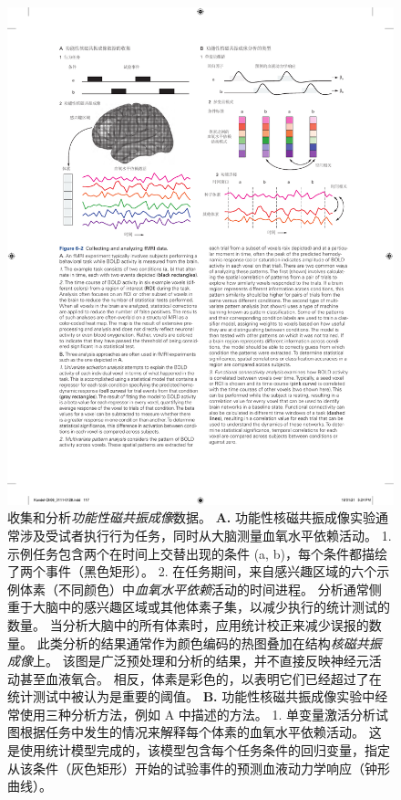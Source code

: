 \begin{figure}[htbp]
	\centering
	\includegraphics[width=1.0\linewidth]{chap06/fig_6_2}
	\caption{收集和分析\textit{功能性磁共振成像}数据。 
		\textbf{A.} 功能性核磁共振成像实验通常涉及受试者执行行为任务，同时从大脑测量血氧水平依赖活动。
		1. 示例任务包含两个在时间上交替出现的条件 (a, b)，每个条件都描绘了两个事件（黑色矩形）。
		2. 在任务期间，来自感兴趣区域的六个示例体素（不同颜色）中\textit{血氧水平依赖}活动的时间进程。 
		分析通常侧重于大脑中的感兴趣区域或其他体素子集，以减少执行的统计测试的数量。
		当分析大脑中的所有体素时，应用统计校正来减少误报的数量。
		此类分析的结果通常作为颜色编码的热图叠加在结构\textit{核磁共振成像}上。
		该图是广泛预处理和分析的结果，并不直接反映神经元活动甚至血液氧合。
		相反，体素是彩色的，以表明它们已经超过了在统计测试中被认为是重要的阈值。
		\textbf{B.} 功能性核磁共振成像实验中经常使用三种分析方法，例如 A 中描述的方法。
		1. 单变量激活分析试图根据任务中发生的情况来解释每个体素的血氧水平依赖活动。 
		这是使用统计模型完成的，该模型包含每个任务条件的回归变量，指定从该条件（灰色矩形）开始的试验事件的预测血液动力学响应（钟形曲线）。 
}
\end{figure}
